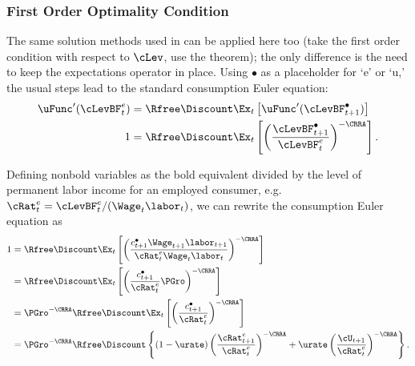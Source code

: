 \documentclass{\handout}
\begin{document}
\subsubsection{First Order Optimality Condition}

The same solution methods used in  can 
be applied here too (take the first order condition with respect to $\cLev$, use
the  theorem); the only difference is the need to keep the expectations operator
in place.  Using $\bullet$ as a placeholder for `e' or `u,' the
usual steps lead to the standard consumption Euler equation:
\begin{equation}\begin{gathered}\begin{aligned}
        \uFunc^{\prime}(\cLevBF^{e}_{t}) & =  \Rfree\Discount \Ex_{t}\left[\uFunc^{\prime}(\cLevBF^{\bullet}_{t+1}) \right]
\\  1         & =  \Rfree\Discount \Ex_{t}\left[\left(\frac{\cLevBF^{\bullet}_{t+1}}{\cLevBF^{e}_{t}}\right)^{-\CRRA} \right]
.
\end{aligned}\end{gathered}\end{equation}

Defining nonbold variables as the bold equivalent divided
by the level of permanent labor income for an employed consumer, e.g.\ ${\cRat}^{e}_{t}=\cLevBF^{e}_{t}/(\Wage_{t}\labor_{t})$, we can rewrite the
consumption Euler equation as
\begin{equation}\begin{gathered}\begin{aligned}
  1         & =  \Rfree\Discount \Ex_{t}\left[\left(\frac{{c}^{\bullet}_{t+1} \Wage_{t+1}\labor_{t+1}}{{\cRat}^{e}_{t} \Wage_{t}\labor_{t}}\right)^{-\CRRA} \right]  
\\          & =  \Rfree\Discount \Ex_{t}\left[\left(\frac{{c}^{\bullet}_{t+1}}{{\cRat}^{e}_{t}}\PGro\right)^{-\CRRA} \right]
\\          & =  \PGro^{-\CRRA}\Rfree\Discount \Ex_{t}\left[\left(\frac{{c}^{\bullet}_{t+1}}{{\cRat}^{e}_{t}}\right)^{-\CRRA} \right] 
\\          & =  \PGro^{-\CRRA}\Rfree\Discount \left\{(1-\urate)\left(\frac{{\cRat}^{e}_{t+1}}{{\cRat}^{e}_{t}}\right)^{-\CRRA}+\urate \left(\frac{\cU_{t+1}}{{\cRat}^{e}_{t}}\right)^{-\CRRA}\right\} \label{eq:Explicit}.
\end{aligned}\end{gathered}\end{equation}
\end{document}
